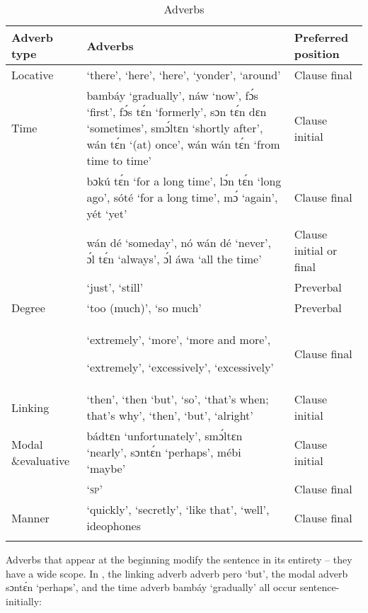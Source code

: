 \begin{table}
\caption{Adverbs}
\label{tab:key:7.12}

\begin{tabularx}{\textwidth}{p{16mm}Ql}
\lsptoprule
Adverb type & Adverbs & Preferred position\\
\midrule
Locative &  ‘there’,   ‘here’,  ‘here’,  ‘yonder’,  ‘around’ & Clause final\\
Time & bambáy ‘gradually’, náw ‘now’, fɔ́s ‘first’, fɔ́s tɛ́n ‘formerly’, sɔn tɛ́n dɛn ‘sometimes’, smɔ́ltɛn ‘shortly after’, wán tɛ́n ‘(at) once’, wán wán tɛ́n ‘from time to time’ & Clause initial\\
& bɔkú tɛ́n ‘for a long time’, lɔ́n tɛ́n ‘long ago’, sóté ‘for a long time’, mɔ́ ‘again’, yét ‘yet’ & Clause final\\
& wán dé ‘someday’, nó wán dé ‘never’, ɔ́l tɛ́n ‘always’, ɔ́l áwa ‘all the time’ & Clause initial or final\\
&  ‘just’,  ‘still’ & Preverbal\\
Degree &  ‘too (much)’, ‘so much’ & Preverbal\\
& {  ‘extremely’,  ‘more’,  ‘more and more’,}

 ‘extremely’,  ‘excessively’,  ‘excessively’ & Clause final\\
Linking &  ‘then’,  ‘then ‘but’,  ‘so’,  ‘that’s when; that’s why’, ‘then’,  ‘but’,  ‘alright’ & Clause initial\\
Modal \&\newline  \mbox{evaluative} & bádtɛn ‘unfortunately’, smɔ́ltɛn ‘nearly’, sɔntɛ́n ‘perhaps’, mébi ‘maybe’ & Clause initial\\
&  ‘\textsc{sp}’ & Clause final\\
Manner &  ‘quickly’,  ‘secretly’,  ‘like that’,  ‘well’, ideophones & Clause final\\
\lspbottomrule
\end{tabularx}
\end{table}
Adverbs that appear at the beginning modify the sentence in its entirety – they have a wide scope. In , the linking adverb adverb pero ‘but’, the modal adverb sɔntɛ́n ‘perhaps’, and the time adverb bambáy ‘gradually’ all occur sentence-initially:


